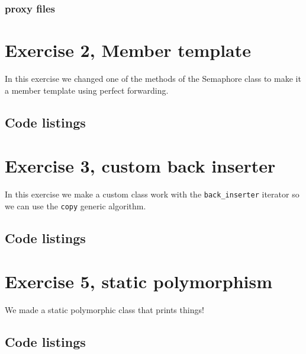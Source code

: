 \documentclass[11pt]{article}
\begin{document}
\subsubsection*{proxy files}





\section*{Exercise 2, Member template}
In this exercise we changed one of the methods of the Semaphore class to make it a member template using perfect forwarding.

\subsection*{Code listings}





\section*{Exercise 3, custom back inserter}
In this exercise we make a custom class work with the \texttt{back\_inserter} iterator so we can use the \texttt{copy} generic algorithm.

\subsection*{Code listings}





\section*{Exercise 5, static polymorphism}
We made a static polymorphic class that prints things!

\subsection*{Code listings}





\end{document}
